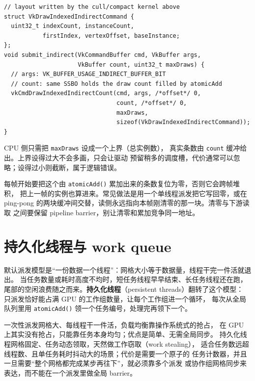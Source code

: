 \documentclass[12pt,a4paper,fontset=fandol]{ctexbook}
\newcommand{\Fn}[1]{\texttt{#1()}}
\newcommand{\Tp}[1]{\texttt{#1}}
\newcommand{\Lang}[1]{\textsf{#1}}
\newcommand{\DomCPU}{\Lang{CPU}}
\newcommand{\DomGPU}{\Lang{GPU}}
\begin{document}
\begin{lstlisting}[style=cppstyle,caption={间接参数缓冲的填充与提交},label={lst:ch08-indirect-submit}]
// layout written by the cull/compact kernel above
struct VkDrawIndexedIndirectCommand {
  uint32_t indexCount, instanceCount,
           firstIndex, vertexOffset, baseInstance;
};
void submit_indirect(VkCommandBuffer cmd, VkBuffer args,
                     VkBuffer count, uint32_t maxDraws) {
  // args: VK_BUFFER_USAGE_INDIRECT_BUFFER_BIT
  // count: same SSBO holds the draw count filled by atomicAdd
  vkCmdDrawIndexedIndirectCount(cmd, args, /*offset*/ 0,
                                count, /*offset*/ 0,
                                maxDraws,
                                sizeof(VkDrawIndexedIndirectCommand));
}
\end{lstlisting}

\DomCPU{} 侧只需把 \Tp{maxDraws} 设成一个上界（总实例数），
真实条数由 \Tp{count} 缓冲给出。上界设得过大不会多画，只会让驱动
预留稍多的调度槽，代价通常可以忽略；设得过小则截断，属于逻辑错误。

\begin{note}[title={count 缓冲的清零时机}]
每帧开始要把这个由 \Fn{atomicAdd} 累加出来的条数复位为零，否则它会跨帧堆积，
把上一帧的实例也算进来。常见做法是用一个单线程派发把它写回零，或在
ping-pong 的两块缓冲间交替，读侧永远指向本帧刚清零的那一块。清零与下游读取
之间要保留 pipeline barrier，别让清零和累加竞争同一地址。
\end{note}

\section{持久化线程与 work queue}

默认派发模型是``一份数据一个线程''：网格大小等于数据量，线程干完一件活就退出。
当任务数量或耗时高度不均时，短任务线程早早结束、长任务线程还在跑，
尾部的空闲浪费随之而来。\textbf{持久化线程}（persistent threads）翻转了这个模型：
只派发恰好能占满 \DomGPU{} 的工作组数量，让每个工作组进一个循环，
每次从全局队列里用 \Fn{atomicAdd} 领一个任务编号，处理完再领下一个。

\begin{compare}[title={一次性派发与持久化线程}]
一次性派发网格大、每线程干一件活，负载均衡靠操作系统式的抢占，
在 \DomGPU{} 上其实没有抢占，只能靠任务本身均匀；优点是简单、无需全局同步。
持久化线程网格固定、任务动态领取，天然做工作窃取（work stealing），
适合任务数远超线程数、且单任务耗时抖动大的场景；代价是需要一个原子的
任务计数器，并且一旦需要``整个网格都完成某步再往下''，就必须靠多个派发
或协作组网格同步来表达，而不能在一个派发里做全局 barrier。
\end{compare}
\end{document}

